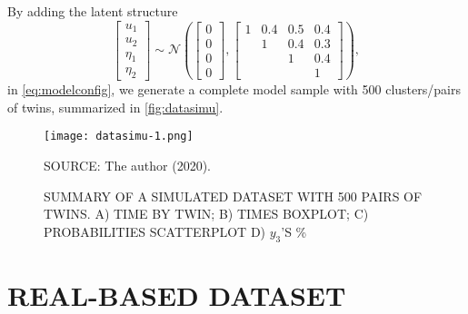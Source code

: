 By adding the latent structure
\[
  \begin{bmatrix} u_{1}\\u_{2}\\\eta_{1}\\\eta_{2} \end{bmatrix}
  \sim\mathcal{N} \left(
    \begin{bmatrix} 0\\0\\0\\0 \end{bmatrix},
    \begin{bmatrix}
      1&0.4&0.5&0.4\\
      &1&0.4&0.3\\
      &&1&0.4\\
      &&&1
    \end{bmatrix}\right),
\]
in \autoref{eq:modelconfig}, we generate a complete model sample with
500 clusters/pairs of twins, summarized in \autoref{fig:datasimu}.

\begin{figure}[H]
  \setlength{\abovecaptionskip}{.0001pt}
  \caption{SUMMARY OF A SIMULATED DATASET WITH 500 PAIRS OF TWINS. A)
    TIME BY TWIN; B) TIMES BOXPLOT; C) PROBABILITIES SCATTERPLOT D)
    \(y_{3}\)'S \%}
  \vspace{0.2cm} \centering
  \texttt{[image: datasimu-1.png]}
  \\
  \vspace{0.2cm}
  \begin{footnotesize}
    SOURCE: The author (2020).
  \end{footnotesize}
  \label{fig:datasimu}
\end{figure}

\section{REAL-BASED DATASET}
\label{cap:data}

